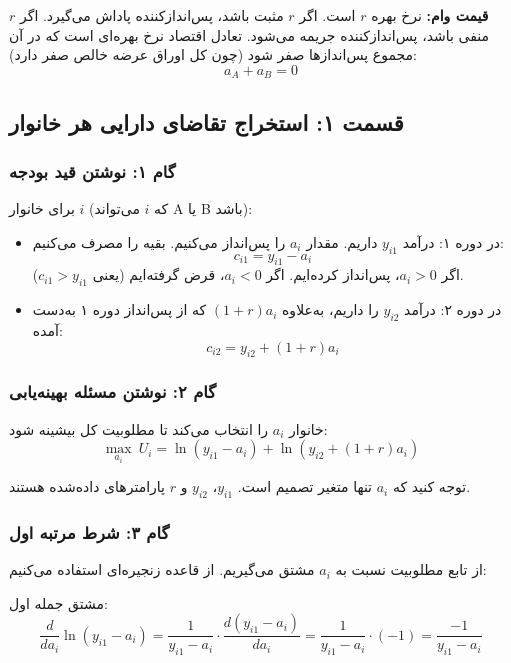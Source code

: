 \documentclass[12pt,a4paper]{article}
\begin{document}
\textbf{قیمت وام:} نرخ بهره $r$ است. اگر $r$ مثبت باشد، پس‌اندازکننده پاداش می‌گیرد. اگر $r$ منفی باشد، پس‌اندازکننده جریمه می‌شود. تعادل اقتصاد نرخ بهره‌ای است که در آن مجموع پس‌اندازها صفر شود (چون کل اوراق عرضه خالص صفر دارد):
\[
	a_A + a_B = 0
\]

\subsection{قسمت ۱: استخراج تقاضای دارایی هر خانوار}

\subsubsection{گام ۱: نوشتن قید بودجه}

برای خانوار $i$ (که $i$ می‌تواند A یا B باشد):

\begin{itemize}
	\item در دوره ۱: درآمد $y_{i1}$ داریم. مقدار $a_i$ را پس‌انداز می‌کنیم. بقیه را مصرف می‌کنیم:
	      \[
		      c_{i1} = y_{i1} - a_i
	      \]
	      اگر $a_i > 0$، پس‌انداز کرده‌ایم. اگر $a_i < 0$، قرض گرفته‌ایم (یعنی $c_{i1} > y_{i1}$).

	\item در دوره ۲: درآمد $y_{i2}$ را داریم، به‌علاوه $(1+r)a_i$ که از پس‌انداز دوره ۱ به‌دست آمده:
	      \[
		      c_{i2} = y_{i2} + (1+r) a_i
	      \]
\end{itemize}

\subsubsection{گام ۲: نوشتن مسئله بهینه‌یابی}

خانوار $a_i$ را انتخاب می‌کند تا مطلوبیت کل بیشینه شود:
\[
	\max_{a_i} \ U_i = \ln(y_{i1} - a_i) + \ln(y_{i2} + (1+r) a_i)
\]

توجه کنید که $a_i$ تنها متغیر تصمیم است. $y_{i1}$، $y_{i2}$ و $r$ پارامترهای داده‌شده هستند.

\subsubsection{گام ۳: شرط مرتبه اول}

از تابع مطلوبیت نسبت به $a_i$ مشتق می‌گیریم. از قاعده زنجیره‌ای استفاده می‌کنیم:

مشتق جمله اول:
\[
	\frac{d}{da_i} \ln(y_{i1} - a_i) = \frac{1}{y_{i1} - a_i} \cdot \frac{d(y_{i1} - a_i)}{da_i} = \frac{1}{y_{i1} - a_i} \cdot (-1) = \frac{-1}{y_{i1} - a_i}
\]
\end{document}
